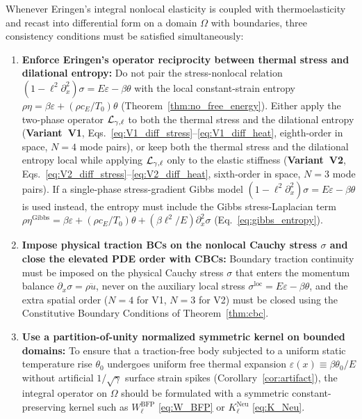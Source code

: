 Whenever Eringen's integral nonlocal elasticity is coupled with thermoelasticity and recast into differential form on a domain $\Omega$ with boundaries, three consistency conditions must be satisfied simultaneously:
\begin{enumerate}[leftmargin=*,align=left]
  \item \textbf{Enforce Eringen's \cite{Eringen1974} operator reciprocity between thermal stress and dilational entropy:} Do not pair the stress-nonlocal relation $(1-\ell^2\partial_x^2)\sigma = E\varepsilon - \beta\theta$ with the local constant-strain entropy $\rho\eta = \beta\varepsilon + (\rho c_E/T_0)\theta$ (Theorem~\ref{thm:no_free_energy}). Either apply the two-phase operator $\mathcal{L}_{\gamma,\ell}$ to both the thermal stress and the dilational entropy (\textbf{Variant~V1}, Eqs.~\eqref{eq:V1_diff_stress}--\eqref{eq:V1_diff_heat}, eighth-order in space, $N=4$ mode pairs), or keep both the thermal stress and the dilational entropy local while applying $\mathcal{L}_{\gamma,\ell}$ only to the elastic stiffness (\textbf{Variant~V2}, Eqs.~\eqref{eq:V2_diff_stress}--\eqref{eq:V2_diff_heat}, sixth-order in space, $N=3$ mode pairs). If a single-phase stress-gradient Gibbs model $(1-\ell^2\partial_x^2)\sigma = E\varepsilon - \beta\theta$ is used instead, the entropy must include the Gibbs stress-Laplacian term $\rho\eta^{\mathrm{Gibbs}} = \beta\varepsilon + (\rho c_E/T_0)\theta + (\beta\ell^2/E)\partial_x^2\sigma$ (Eq.~\eqref{eq:gibbs_entropy}).
  \item \textbf{Impose physical traction BCs on the nonlocal Cauchy stress $\sigma$ and close the elevated PDE order with CBCs:} Boundary traction continuity must be imposed on the physical Cauchy stress $\sigma$ that enters the momentum balance $\partial_x\sigma = \rho\ddot{u}$, never on the auxiliary local stress $\sigma^{\mathrm{loc}} = E\varepsilon - \beta\theta$, and the extra spatial order ($N=4$ for V1, $N=3$ for V2) must be closed using the Constitutive Boundary Conditions of Theorem~\ref{thm:cbc}.
  \item \textbf{Use a partition-of-unity normalized symmetric kernel on bounded domains:} To ensure that a traction-free body subjected to a uniform static temperature rise $\theta_0$ undergoes uniform free thermal expansion $\varepsilon(x) \equiv \beta\theta_0/E$ without artificial $1/\sqrt{\gamma}$ surface strain spikes (Corollary~\ref{cor:artifact}), the integral operator on $\Omega$ should be formulated with a symmetric constant-preserving kernel such as $W_\ell^{\mathrm{BFP}}$ \eqref{eq:W_BFP} or $K_\ell^{\mathrm{Neu}}$ \eqref{eq:K_Neu}.
\end{enumerate}
